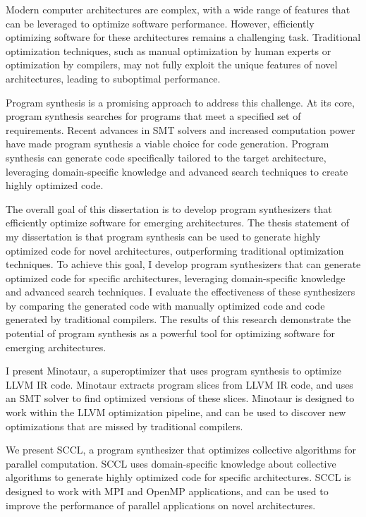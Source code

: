 Modern computer architectures are complex, with a wide range of
features that can be leveraged to optimize software performance.
However, efficiently optimizing software for these architectures
remains a challenging task. Traditional optimization techniques,
such as manual optimization by human experts or optimization by
compilers, may not fully exploit the unique features of novel
architectures, leading to suboptimal performance.

Program synthesis is a promising approach to address this challenge.
At its core, program synthesis searches for programs that meet a
specified set of requirements. Recent advances in SMT solvers and
increased computation power have made program synthesis a viable
choice for code generation. Program synthesis can generate code
specifically tailored to the target architecture, leveraging
domain-specific knowledge and advanced search techniques to create
highly optimized code.

The overall goal of this dissertation is to develop program
synthesizers that efficiently optimize software for emerging
architectures. The thesis statement of my dissertation is that program
synthesis can be used to generate highly optimized code for novel
architectures, outperforming traditional optimization techniques. To
achieve this goal, I develop program synthesizers that can
generate optimized code for specific architectures, leveraging
domain-specific knowledge and advanced search techniques. I
evaluate the effectiveness of these synthesizers by comparing the
generated code with manually optimized code and code generated by
traditional compilers. The results of this research demonstrate
the potential of program synthesis as a powerful tool for optimizing
software for emerging architectures.

I present Minotaur, a superoptimizer that uses program synthesis
to optimize LLVM IR code. Minotaur extracts program slices from LLVM IR
code, and uses an SMT solver to find optimized versions of these slices.
Minotaur is designed to work within the LLVM optimization pipeline, and
can be used to discover new optimizations that are missed by traditional
compilers.

We  present SCCL, a program synthesizer that optimizes collective
algorithms for parallel computation. SCCL uses domain-specific knowledge
about collective algorithms to generate highly optimized code for
specific architectures. SCCL is designed to work with MPI and OpenMP
applications, and can be used to improve the performance of parallel
applications on novel architectures.




